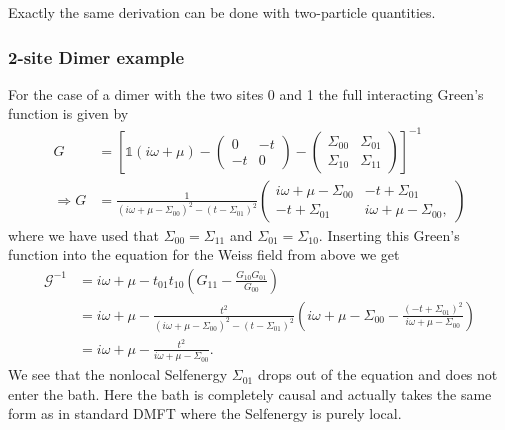 \documentclass[12pt,a4paper]{scrartcl}
\numberwithin{equation}{section}
\newcommand{\unity}{\mathds{1}}
\begin{document}
Exactly the same derivation can be done with two-particle quantities.


\subsubsection{2-site Dimer example}
For the case of a dimer with the two sites 0 and 1 the full interacting Green's function is given by
\begin{align}
G &=
\left[ \unity (i\omega + \mu ) -
 \begin{pmatrix}
     0 & -t \\ -t & 0
 \end{pmatrix}
 -
 \begin{pmatrix}
     \Sigma_{00} & \Sigma_{01} \\ \Sigma_{10} & \Sigma_{11}
 \end{pmatrix}
 \right]^{-1} \\
%
\Rightarrow G &= 
     \frac{1}{(i\omega + \mu-\Sigma_{00})^{2} -(t-\Sigma_{01})^2 }
    \begin{pmatrix}
      i\omega + \mu-\Sigma_{00} & -t+\Sigma_{01} \\ -t+\Sigma_{01}  & i\omega + \mu -\Sigma_{00} ,
     \end{pmatrix} 
\end{align}
where we have used that $\Sigma_{00} = \Sigma_{11}$ and $\Sigma_{01} = \Sigma_{10}$.
Inserting this Green's function into the equation for the Weiss field from above we get
\begin{align}
 \mathscr{G}^{-1} &= i\omega + \mu -  t_{01} t_{10} \left( G_{11} - \frac{G_{10} G_{01} }{G_{00}} \right) \\
 &= i\omega + \mu -  \frac{t^2}{(i\omega + \mu-\Sigma_{00})^{2} -(t-\Sigma_{01})^2 } 
                 \left( i\omega + \mu-\Sigma_{00} - \frac{ (-t+\Sigma_{01})^2 }{i\omega + \mu-\Sigma_{00}} \right) \\
&= i\omega + \mu -  \frac{t^2}{i\omega + \mu-\Sigma_{00} } . \label{eq:correct_bath_dimer}
\end{align}
We see that the nonlocal Selfenergy $\Sigma_{01}$ drops out of the equation and does not enter the bath. 
Here the bath is completely causal and actually takes the same form as in standard DMFT where the Selfenergy is purely local.
\end{document}
